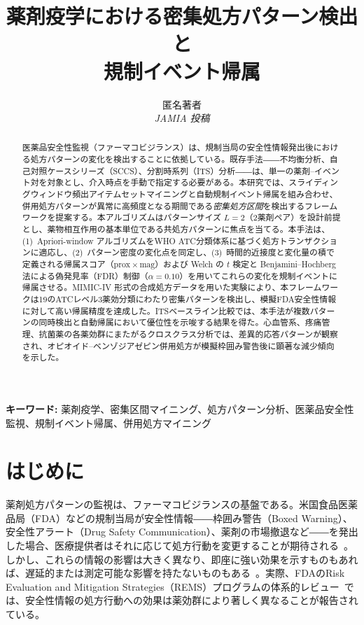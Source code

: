 \documentclass[11pt]{article}
\title{薬剤疫学における密集処方パターン検出と\\規制イベント帰属}
\author{
  匿名著者\\
  \textit{JAMIA 投稿}
}
\date{}
\begin{document}
\maketitle

\begin{abstract}
医薬品安全性監視（ファーマコビジランス）は、規制当局の安全性情報発出後における処方パターンの変化を検出することに依拠している。既存手法――不均衡分析、自己対照ケースシリーズ（SCCS）、分割時系列（ITS）分析――は、単一の薬剤--イベント対を対象とし、介入時点を手動で指定する必要がある。本研究では、スライディングウィンドウ頻出アイテムセットマイニングと自動規制イベント帰属を組み合わせ、併用処方パターンが異常に高頻度となる期間である\emph{密集処方区間}を検出するフレームワークを提案する。本アルゴリズムはパターンサイズ $L = 2$（2薬剤ペア）を設計前提とし、薬物相互作用の基本単位である共処方パターンに焦点を当てる。本手法は、(1)~Apriori-window アルゴリズムをWHO ATC分類体系に基づく処方トランザクションに適応し、(2)~パターン密度の変化点を同定し、(3)~時間的近接度と変化量の積で定義される帰属スコア（$\mathrm{prox} \times \mathrm{mag}$）および Welch の $t$ 検定と Benjamini--Hochberg 法による偽発見率（FDR）制御（$\alpha = 0.10$）を用いてこれらの変化を規制イベントに帰属させる。MIMIC-IV 形式の合成処方データを用いた実験により、本フレームワークは19のATCレベル3薬効分類にわたり密集パターンを検出し、模擬FDA安全性情報に対して高い帰属精度を達成した。ITSベースライン比較では、本手法が複数パターンの同時検出と自動帰属において優位性を示唆する結果を得た。心血管系、疼痛管理、抗菌薬の各薬効群にまたがるクロスクラス分析では、差異的応答パターンが観察され、オピオイド--ベンゾジアゼピン併用処方が模擬枠囲み警告後に顕著な減少傾向を示した。
\end{abstract}

\noindent\textbf{キーワード:} 薬剤疫学、密集区間マイニング、処方パターン分析、医薬品安全性監視、規制イベント帰属、併用処方マイニング

\section{はじめに}\label{sec:intro}

薬剤処方パターンの監視は、ファーマコビジランスの基盤である。米国食品医薬品局（FDA）などの規制当局が安全性情報――枠囲み警告（Boxed Warning）、安全性アラート（Drug Safety Communication）、薬剤の市場撤退など――を発出した場合、医療提供者はそれに応じて処方行動を変更することが期待される~\citep{dusetzina2012fda}。しかし、これらの情報の影響は大きく異なり、即座に強い効果を示すものもあれば、遅延的または測定可能な影響を持たないものもある~\citep{marcum2012fda}。実際、FDAのRisk Evaluation and Mitigation Strategies（REMS）プログラムの体系的レビュー~\citep{onakpoya2019withdrawals}では、安全性情報の処方行動への効果は薬効群により著しく異なることが報告されている。
\end{document}
